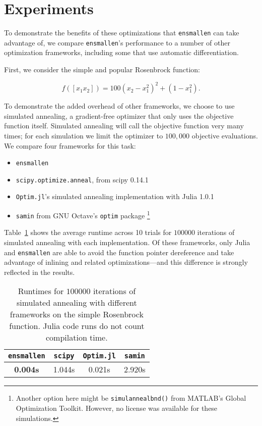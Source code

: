 \documentclass{article}
\begin{document}

\section{Experiments}

To demonstrate the benefits of these optimizations that {\tt ensmallen} can take
advantage of, we compare {\tt ensmallen}'s performance to a number of other
optimization frameworks, including some that use automatic differentiation.

First, we consider the simple and popular Rosenbrock function: %

\begin{equation}
f([x_1 x_2]) = 100 (x_2 - x_1^2)^2 + (1 - x_1^2).
\end{equation}

To demonstrate the added overhead of other frameworks, we choose to use
simulated annealing, %
a gradient-free optimizer that only uses the objective function itself.
Simulated annealing will call the objective function very many times; for each
simulation we limit the optimizer to $100,000$ objective evaluations.  We
compare four frameworks for this task:

\begin{itemize}
  \item {\tt ensmallen}
  \item {\tt scipy.optimize.anneal}, from scipy 0.14.1 %
  \item {\tt Optim.jl}'s simulated annealing implementation with Julia 1.0.1
  \item {\tt samin} from GNU Octave's {\tt optim} package %
\footnote{Another option here might be {\tt simulannealbnd()} from MATLAB's
Global Optimization Toolkit.  However, no license was available for these
simulations.}
\end{itemize}

Table~\ref{tab:rosenbrock_results} shows the average runtime
across 10 trials for $100000$ iterations of simulated annealing with each
implementation.  Of these frameworks, only Julia and {\tt ensmallen} are able to
avoid the function pointer dereference and take advantage of inlining and
related optimizations---and this difference is strongly reflected in the
results.

\begin{table}[t]
\begin{center}
\begin{tabular}{cccc}
\toprule
{\tt ensmallen} & {\tt scipy} & {\tt Optim.jl} & {\tt samin} \\
\midrule
{\bf 0.004s} & 1.044s & 0.021s & 2.920s \\
\bottomrule
\end{tabular}
\end{center}
\caption{Runtimes for $100000$ iterations of simulated annealing with different
frameworks on the simple Rosenbrock function.  Julia code runs do not count
compilation time.}
\label{tab:rosenbrock_results}
\end{table}
\end{document}
